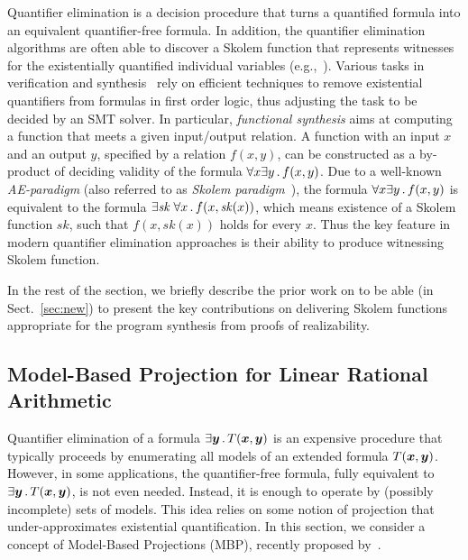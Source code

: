 Quantifier elimination is a decision procedure that turns a quantified formula into an equivalent quantifier-free formula.
In addition, the quantifier elimination algorithms are often able to discover a Skolem function that represents witnesses for the existentially quantified individual variables (e.g.,~\cite{DBLP:conf/cav/BalabanovJ11,kuncak2013functional,KLXJOIA,Chakraborty15}).
%
Various tasks in verification and synthesis~\cite{DBLP:conf/fmcad/CimattiGMT13,DBLP:conf/popl/BeyeneCPR14,DBLP:conf/nfm/GasconT14} rely on efficient techniques to remove existential quantifiers from formulas in first order logic, thus adjusting the task to be decided by an SMT solver.
In particular, \emph{functional synthesis} aims at computing a function that meets a given input/output relation.
A function with an input $x$ and an output $y$, specified by a relation $f(x,y)$, can be constructed as a by-product of deciding validity of the formula $\forall x \exists y \,.\, f(x,y)$.
Due to a well-known \emph{AE-paradigm} (also referred to as \emph{Skolem paradigm}~\cite{DBLP:conf/popl/PnueliR89}),
the formula $\forall x \exists y \,.\, f(x,y)$ is equivalent to the formula $\exists \mathit{sk} \; \forall x \,.\, f(x, \mathit{sk}(x))$, which means existence of a Skolem function $\mathit{sk}$, such that $f(x,\mathit{sk}(x))$ holds for every $x$.
Thus the key feature in modern quantifier elimination approaches is their ability to produce witnessing Skolem function.

In the rest of the section, we briefly describe the prior work on \aeval to be able (in Sect.~\ref{sec:new}) to present the key contributions on delivering Skolem functions appropriate for the program synthesis from proofs of realizability.

\subsection{Model-Based Projection for Linear Rational Arithmetic}
\label{sec:mbp}

Quantifier elimination of a formula $\exists \vy \such T(\vx,\vy)$ is an expensive procedure that typically proceeds by enumerating all models of an extended formula $T(\vx,\vy)$.
However, in some applications, the quantifier-free formula, fully equivalent to $\exists \vy \such T(\vx,\vy)$, is not even needed.
Instead, it is enough to operate by (possibly incomplete) sets of models.
This idea relies on some notion of projection that under-approximates existential quantification.
In this section, we consider a concept of Model-Based Projections (MBP), recently proposed by~\cite{komuravelli2014smt,Dutertre}.

